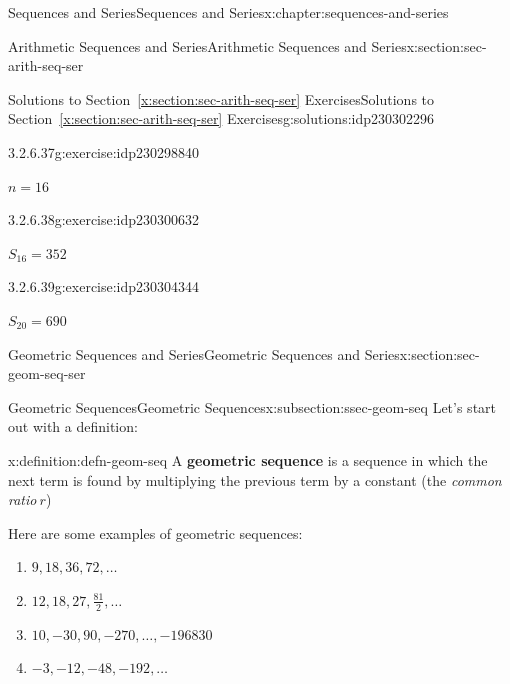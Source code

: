 \documentclass[twoside,10pt,]{book}
\newcommand{\xreffont}{\relax}
\newcommand{\terminology}[1]{\textbf{#1}}
\numberwithin{equation}{section}
\begin{document}
\begin{chapterptx}{Sequences and Series}{}{Sequences and Series}{}{}{x:chapter:sequences-and-series}
\begin{sectionptx}{Arithmetic Sequences and Series}{}{Arithmetic Sequences and Series}{}{}{x:section:sec-arith-seq-ser}
\begin{solutions-subsection}{Solutions to Section~{\xreffont\ref*{x:section:sec-arith-seq-ser}} Exercises}{}{Solutions to Section~{\xreffont\ref*{x:section:sec-arith-seq-ser}} Exercises}{}{}{g:solutions:idp230302296}
\begin{exercisegroup}
\end{exercisegroup}
\par\medskip\noindent
\begin{divisionsolution}{3.2.6.37}{}{g:exercise:idp230298840}%
\par\smallskip%
\noindent\hypertarget{g:solution:idp230295896-main}{}\(n=16\)\end{divisionsolution}%
\begin{divisionsolution}{3.2.6.38}{}{g:exercise:idp230300632}%
\par\smallskip%
\noindent\hypertarget{g:solution:idp230303832-main}{}\(S_{16} = 352\)\end{divisionsolution}%
\begin{divisionsolution}{3.2.6.39}{}{g:exercise:idp230304344}%
\par\smallskip%
\noindent\hypertarget{g:solution:idp230300376-main}{}\(S_{20} = 690\)\end{divisionsolution}%
\end{solutions-subsection}
\end{sectionptx}
%
%
\typeout{************************************************}
\typeout{************************************************}
%
\begin{sectionptx}{Geometric Sequences and Series}{}{Geometric Sequences and Series}{}{}{x:section:sec-geom-seq-ser}
%
%
\typeout{************************************************}
\typeout{************************************************}
%
\begin{subsectionptx}{Geometric Sequences}{}{Geometric Sequences}{}{}{x:subsection:ssec-geom-seq}
Let's start out with a definition: \begin{definition}{}{x:definition:defn-geom-seq}%
A \terminology{geometric sequence} is a sequence in which the next term is found by multiplying the previous term by a constant (the \emph{common ratio}\(\ r\))\end{definition}
%
\par
Here are some examples of geometric sequences:%
\begin{enumerate}[label=(\alph*)]
\item{}\(\displaystyle 9, 18, 36, 72, \ldots\)%
\item{}\(\displaystyle 12, 18, 27, \frac{81}{2},\ldots\)%
\item{}\(\displaystyle 10, -30, 90, -270, \ldots,  -196830\)%
\item{}\(\displaystyle -3, -12, -48, -192, \ldots\)%

\end{enumerate}
\end{subsectionptx}
\end{sectionptx}
\end{chapterptx}
\end{document}
